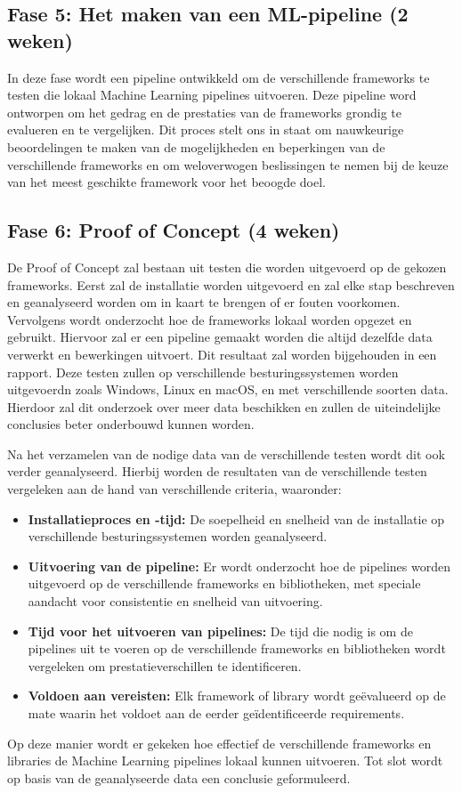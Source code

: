 \subsection{Fase 5: Het maken van een ML-pipeline (2 weken)}
In deze fase wordt een pipeline ontwikkeld om de verschillende frameworks te testen die lokaal Machine Learning pipelines uitvoeren. Deze pipeline word ontworpen om het gedrag en de prestaties van de frameworks grondig te evalueren en te vergelijken. Dit proces stelt ons in staat om nauwkeurige beoordelingen te maken van de mogelijkheden en beperkingen van de verschillende frameworks en om weloverwogen beslissingen te nemen bij de keuze van het meest geschikte framework voor het beoogde doel.
\subsection{Fase 6: Proof of Concept (4 weken)}
De Proof of Concept zal bestaan uit testen die worden uitgevoerd op de gekozen frameworks. Eerst zal de installatie worden uitgevoerd en zal elke stap beschreven en geanalyseerd worden om in kaart te brengen of er fouten voorkomen. Vervolgens wordt onderzocht hoe de frameworks lokaal worden opgezet en gebruikt. Hiervoor zal er een pipeline gemaakt worden die altijd dezelfde data verwerkt en bewerkingen uitvoert. Dit resultaat zal worden bijgehouden in een rapport.
Deze testen zullen op verschillende besturingssystemen worden uitgevoerdn zoals Windows, Linux en macOS, en met verschillende soorten data. Hierdoor zal dit onderzoek over meer data beschikken en zullen de uiteindelijke conclusies beter onderbouwd kunnen worden.

Na het verzamelen van de nodige data van de verschillende testen wordt dit ook verder geanalyseerd. Hierbij worden de resultaten van de verschillende testen vergeleken aan de hand van verschillende criteria, waaronder:
\begin{itemize}
  \item \textbf{Installatieproces en -tijd:} De soepelheid en snelheid van de installatie op verschillende besturingssystemen worden geanalyseerd.
  \item \textbf{Uitvoering van de pipeline:} Er wordt onderzocht hoe de pipelines worden uitgevoerd op de verschillende frameworks en bibliotheken, met speciale aandacht voor consistentie en snelheid van uitvoering.
  \item \textbf{Tijd voor het uitvoeren van pipelines:} De tijd die nodig is om de pipelines uit te voeren op de verschillende frameworks en bibliotheken wordt vergeleken om prestatieverschillen te identificeren.
  \item \textbf{Voldoen aan vereisten:} Elk framework of library wordt geëvalueerd op de mate waarin het voldoet aan de eerder geïdentificeerde requirements.
\end{itemize}
Op deze manier wordt er gekeken hoe effectief de verschillende frameworks en libraries de Machine Learning pipelines lokaal kunnen uitvoeren. Tot slot wordt op basis van de geanalyseerde data een conclusie geformuleerd.\\
